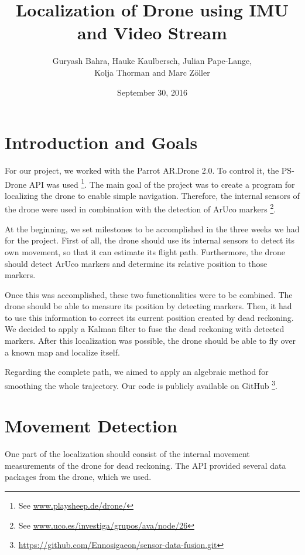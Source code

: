 \documentclass[12pt]{article}
\title{Localization of Drone using IMU and Video Stream}
\date{September 30, 2016}
\author{Guryash Bahra, Hauke Kaulbersch, Julian Pape-Lange,\\ Kolja Thorman and Marc Z\"oller}
\begin{document}
\maketitle
\thispagestyle{empty}
\newpage

\section{Introduction and Goals} \label{sec:Introduction}
For our project, we worked with the Parrot AR.Drone 2.0. To control it, the PS-Drone API was used \footnote{
	See \url{www.playsheep.de/drone/}
}. The main goal of the project was to create a program for localizing the drone to enable simple navigation. Therefore, the internal sensors of the drone were used in combination with the detection of ArUco markers \footnote{
	See \url{www.uco.es/investiga/grupos/ava/node/26}
}.

At the beginning, we set milestones to be accomplished in the three weeks we had for the project. First of all, the drone should use its internal sensors to detect its own movement, so that it can estimate its flight path. Furthermore, the drone should detect ArUco markers and determine its relative position to those markers.

Once this was accomplished, these two functionalities were to be combined. The drone should be able to measure its position by detecting markers. Then, it had to use this information to correct its current position created by dead reckoning. We decided to apply a Kalman filter to fuse the dead reckoning with detected markers. After this localization was possible, the drone should be able to fly over a known map and localize itself.

Regarding the complete path, we aimed to apply an algebraic method for smoothing the whole trajectory. Our code is publicly available on GitHub \footnote{
	\url{https://github.com/Ennosigaeon/sensor-data-fusion.git}
}.

\section{Movement Detection} \label{sec:Movement}
One part of the localization should consist of the internal movement measurements of the drone for dead reckoning. The API provided several data packages from the drone, which we used.
\end{document}
